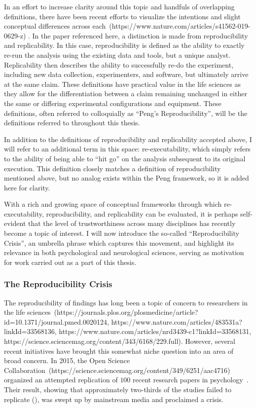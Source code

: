 In an effort to increase clarity around this topic and handfuls of overlapping definitions, there have been recent
efforts to visualize the intentions and slight conceptual differences across each~\tocite (https://www.nature.com/articles/s41562-019-0629-z) .
In the paper referenced here, a distinction is made from reproducibility and replicability. In this case,
reproducibility is defined as the ability to exactly re-run the analysis using the existing data and tools, but a
unique analyst. Replicability then describes the ability to successfully re-do the experiment, including new data
collection, experimenters, and software, but ultimately arrive at the same claim. These definitions have practical
value in the life sciences as they allow for the differentiation between a claim remaining unchanged in either the same
or differing experimental configurations and equipment. These definitions, often referred to colloquially as ``Peng's
Reproducibility'', will be the definitions referred to throughout this thesis.

In addition to the definitions of reproducibility and replicability accepted above, I will refer to an additional term
in this space: re-executability, which simply refers to the ability of being able to ``hit go'' on the analysis
subsequent to its original execution. This definition closely matches a definition of reproducibility mentioned above,
but no analog exists within the Peng framework, so it is added here for clarity.

With a rich and growing space of conceptual frameworks through which re-executability, reproducibility, and
replicability can be evaluated, it is perhaps self-evident that the level of trustworthiness across many disciplines
has recently become a topic of interest. I will now introduce the so-called ``Reproducibility Crisis'', an umbrella
phrase which captures this movement, and highlight its relevance in both psychological and neurological sciences,
serving as motivation for work carried out as a part of this thesis.

\subsubsection{The Reproducibility Crisis}

The reproducibility of findings has long been a topic of concern to researchers in the life sciences~\tocite (https://journals.plos.org/plosmedicine/article?id=10.1371/journal.pmed.0020124, https://www.nature.com/articles/483531a?linkId=33568136, https://www.nature.com/articles/nrd3439-c1?linkId=33568131, https://science.sciencemag.org/content/343/6168/229.full).
However, several recent initiatives have brought this somewhat niche question into an area of broad concern. In 2015,
the Open Science Collaboration~\tocite (https://science.sciencemag.org/content/349/6251/aac4716) organized an attempted
replication of $100$ recent research papers in psychology~\tocite. Their result, showing that approximately two-thirds
of the studies failed to replicate (), was swept up by mainstream media and proclaimed a crisis.

